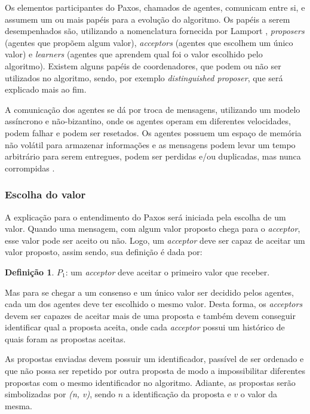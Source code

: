 \documentclass[12pt,
openright, 
oneside,
a4paper,
brazil]{facom-ufu-abntex2}
\theoremstyle{definition}
\newtheorem{definition}{Definição}
\begin{document}
Os elementos participantes do Paxos, chamados de agentes, comunicam entre si, e assumem 
um ou mais papéis para a evolução do algoritmo. Os papéis a serem desempenhados são, 
utilizando a nomenclatura fornecida por Lamport \citep{lamport2001paxos}, 
\textit{proposers} (agentes que propõem algum valor), \textit{acceptors} 
(agentes que escolhem um único valor) e \textit{learners} (agentes que aprendem
qual foi o valor escolhido pelo algoritmo).
Existem alguns papéis de coordenadores, que podem ou não ser utilizados no algoritmo, 
sendo, por exemplo \textit{distinguished proposer}, que será explicado mais ao fim.

A comunicação dos agentes se dá por troca de mensagens, utilizando um modelo assíncrono e
não-bizantino, onde os agentes operam em diferentes velocidades, podem falhar e podem ser
resetados. Os agentes possuem um espaço de memória não volátil para armazenar informações e
as mensagens podem levar um tempo arbitrário para serem entregues, podem ser perdidas e/ou 
duplicadas, mas nunca corrompidas \citep{lamport2001paxos}.

\subsubsection{Escolha do valor}
A explicação para o entendimento do Paxos será iniciada pela escolha de um valor. 
Quando uma mensagem, com algum valor proposto chega para o \textit{acceptor}, esse valor pode 
ser aceito ou não. Logo, um \textit{acceptor} deve ser capaz de aceitar um valor proposto, 
assim sendo, sua definição é dada por:

\begin{definition}
$P_1$: um \textit{acceptor} deve aceitar o primeiro valor que receber.
\end{definition}

Mas para se chegar a um consenso e um único valor ser decidido pelos agentes, cada um
dos agentes deve ter escolhido o mesmo valor. Desta forma, os \textit{acceptors} devem
ser capazes de aceitar mais de uma proposta e também devem conseguir identificar qual
a proposta aceita, onde cada \textit{acceptor} possui um histórico de quais foram as
propostas aceitas.

As propostas enviadas devem possuir um identificador, passível de ser ordenado e que não 
possa ser repetido por outra proposta de modo a impossibilitar diferentes propostas com o mesmo
identificador no algoritmo. Adiante, as propostas serão simbolizadas por 
\textit{(n, v)}, sendo $n$ a identificação da proposta e $v$ o valor da mesma.
\end{document}
